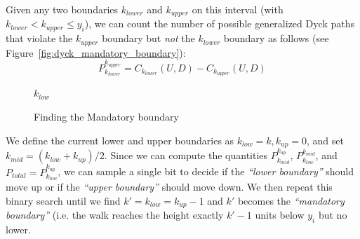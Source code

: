 Given any two boundaries $k_{lower}$ and $k_{upper}$ on this interval (with $k_{lower} < k_{upper} \le y_i$),
we can count the number of possible generalized Dyck paths that violate the $k_{upper}$ boundary but \emph{not} the $k_{lower}$ boundary as follows
(see Figure~\ref{fig:dyck_mandatory_boundary}):
\[
P_{k_{lower}}^{k_{upper}} = C_{k_{lower}}(U,D) - C_{k_{upper}}(U,D)
\]
\begin{figure}
\vspace{-1.5em}
\begin{framed}
    \renewcommand\figurename{Algorithm}
    \caption{Finding the Mandatory boundary}
    \label{alg:mandatory_boundary}
    \begin{algorithmic}[1]
                \vspace{.3em}
                \vspace{.3em}
                \vspace{.3em}
                \vspace{.3em}
            \EndWhile
            \State \Return $k_{low}$
        \EndFunction
    \end{algorithmic}
\end{framed}
\end{figure}
We define the current lower and upper boundaries as $k_{low} = k, k_{up} = 0$, and set $k_{mid} = (k_{low} + k_{up})/2$.
Since we can compute the quantities $P_{k_{mid}}^{k_{up}}$, $P_{k_{low}}^{k_{mid}}$, and $P_{total} = P_{k_{low}}^{k_{up}}$,
we can sample a single bit to decide if the \emph{``lower boundary''} should move up or if the \emph{``upper boundary''} should move down.
We then repeat this binary search until we find $k' = k_{low} = k_{up}-1$ and $k'$ becomes the \emph{``mandatory boundary''}
(i.e. the walk reaches the height exactly $k'-1$ units below $y_i$ but no lower.

